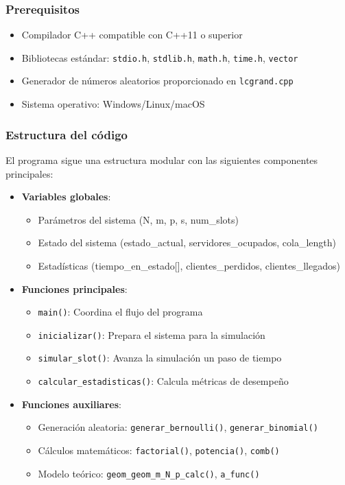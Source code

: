 \documentclass{article}
\begin{document}
\subsubsection{Prerequisitos}

\begin{itemize}
    \item Compilador C++ compatible con C++11 o superior
    \item Bibliotecas estándar: \texttt{stdio.h}, \texttt{stdlib.h}, \texttt{math.h}, \texttt{time.h}, \texttt{vector}
    \item Generador de números aleatorios proporcionado en \texttt{lcgrand.cpp}
    \item Sistema operativo: Windows/Linux/macOS
\end{itemize}

\subsubsection{Estructura del código}

El programa sigue una estructura modular con las siguientes componentes principales:

\begin{itemize}
    \item \textbf{Variables globales}:
    \begin{itemize}
        \item Parámetros del sistema (N, m, p, s, num\_slots)
        \item Estado del sistema (estado\_actual, servidores\_ocupados, cola\_length)
        \item Estadísticas (tiempo\_en\_estado[], clientes\_perdidos, clientes\_llegados)
    \end{itemize}
    
    \item \textbf{Funciones principales}:
    \begin{itemize}
        \item \texttt{main()}: Coordina el flujo del programa
        \item \texttt{inicializar()}: Prepara el sistema para la simulación
        \item \texttt{simular\_slot()}: Avanza la simulación un paso de tiempo
        \item \texttt{calcular\_estadisticas()}: Calcula métricas de desempeño
    \end{itemize}
    
    \item \textbf{Funciones auxiliares}:
    \begin{itemize}
        \item Generación aleatoria: \texttt{generar\_bernoulli()}, \texttt{generar\_binomial()}
        \item Cálculos matemáticos: \texttt{factorial()}, \texttt{potencia()}, \texttt{comb()}
        \item Modelo teórico: \texttt{geom\_geom\_m\_N\_p\_calc()}, \texttt{a\_func()}
    \end{itemize}
\end{itemize}
\end{document}
